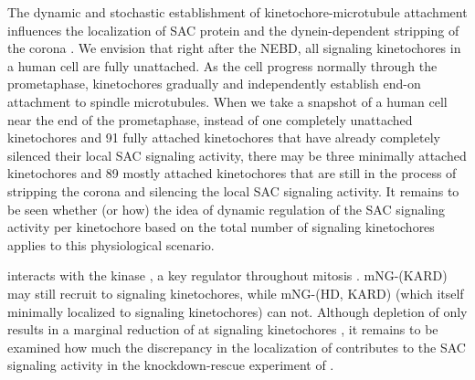The dynamic and stochastic establishment of kinetochore-microtubule attachment influences the localization of SAC protein and the dynein-dependent stripping of the corona \cite{SACSilencing_Etemad2019, SACSilencing_Kuhn2019, CENP-FLimitsStripping}. We envision that right after the NEBD, all signaling kinetochores in a human cell are fully unattached. As the cell progress normally through the prometaphase, kinetochores gradually and independently establish end-on attachment to spindle microtubules. When we take a snapshot of a human cell near the end of the prometaphase, instead of one completely unattached kinetochores and 91 fully attached kinetochores that have already completely silenced their local SAC signaling activity, there may be three minimally attached kinetochores and 89 mostly attached kinetochores that are still in the process of stripping the corona and silencing the local SAC signaling activity. It remains to be seen whether (or how) the idea of dynamic regulation of the SAC signaling activity per kinetochore based on the total number of signaling kinetochores applies to this physiological scenario.

 interacts with the kinase , a key regulator throughout mitosis \cite{BUBR1-PLK1}. mNG-(\textDelta{}KARD) may still recruit  to signaling kinetochores, while mNG-(\textDelta{}HD, \textDelta{}KARD) (which itself minimally localized to signaling kinetochores) can not. Although depletion of  only results in a marginal reduction of  at signaling kinetochores \cite{CENPU+BUB1-PLK1}, it remains to be examined how much the discrepancy in the localization of  contributes to the SAC signaling activity in the knockdown-rescue experiment of .


